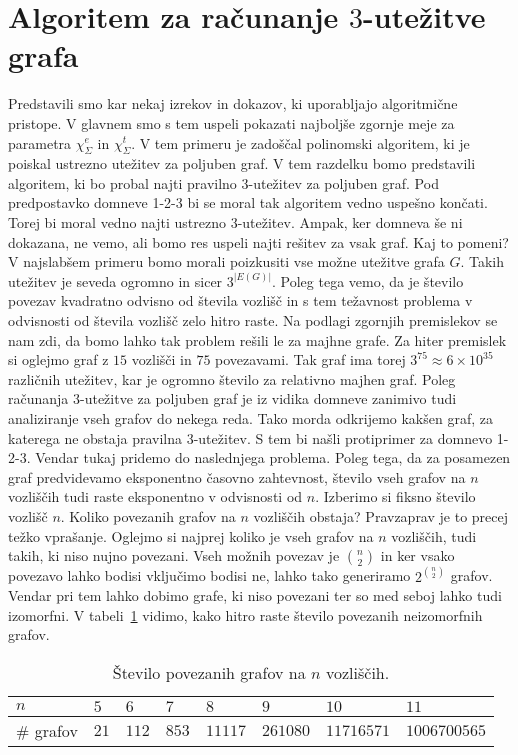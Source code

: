 \documentclass[12pt,a4paper,twoside]{article}
\theoremstyle{definition} %
\theoremstyle{plain} %
\newcommand{\ec}{\chi_{\Sigma}^e}
\newcommand{\ect}{\chi_{\Sigma}^t}
\numberwithin{equation}{section}  %
\begin{document}
\section{Algoritem za računanje $3$-utežitve grafa}
Predstavili smo kar nekaj izrekov in dokazov, ki uporabljajo algoritmične pristope. V glavnem smo s tem uspeli pokazati najboljše zgornje meje za parametra $\ec$ in $\ect$. V tem primeru je zadoščal polinomski algoritem, ki je poiskal ustrezno utežitev za poljuben graf. V tem razdelku bomo predstavili algoritem, ki bo probal najti pravilno $3$-utežitev za poljuben graf. Pod predpostavko domneve 1-2-3 bi se moral tak algoritem vedno uspešno končati. Torej bi moral vedno najti ustrezno $3$-utežitev. Ampak, ker domneva še ni dokazana, ne vemo, ali bomo res uspeli najti rešitev za vsak graf. Kaj to pomeni? V najslabšem primeru bomo morali poizkusiti vse možne utežitve grafa $G$. Takih utežitev je seveda ogromno in sicer $3^{|E(G)|}$. Poleg tega vemo, da je število povezav kvadratno odvisno od števila vozlišč in s tem težavnost problema v odvisnosti od števila vozlišč zelo hitro raste. Na podlagi zgornjih premislekov se nam zdi, da bomo lahko tak problem rešili le za majhne grafe. Za hiter premislek si oglejmo graf z $15$ vozlišči in $75$ povezavami. Tak graf ima torej $3^{75} \approx 6 \times 10^{35}$ različnih utežitev, kar je ogromno število za relativno majhen graf. Poleg računanja $3$-utežitve za poljuben graf je iz vidika domneve zanimivo tudi analiziranje vseh grafov do nekega reda. Tako morda odkrijemo kakšen graf, za katerega ne obstaja pravilna $3$-utežitev. S tem bi našli protiprimer za domnevo 1-2-3. Vendar tukaj pridemo do naslednjega problema. Poleg tega, da za posamezen graf predvidevamo eksponentno časovno zahtevnost, število vseh grafov na $n$ vozliščih tudi raste eksponentno v odvisnosti od $n$. Izberimo si fiksno število vozlišč $n$. Koliko povezanih grafov na $n$ vozliščih obstaja? Pravzaprav je to precej težko vprašanje. Oglejmo si najprej koliko je vseh grafov na $n$ vozliščih, tudi takih, ki niso nujno povezani. Vseh možnih povezav je $ {n \choose 2}$ in ker vsako povezavo lahko bodisi vključimo bodisi ne, lahko tako generiramo $2^{n \choose 2}$ grafov. Vendar pri tem lahko dobimo grafe, ki niso povezani ter so med seboj lahko tudi izomorfni. V tabeli~\ref{tbl:gnumb} vidimo, kako hitro raste število povezanih neizomorfnih grafov.
\begin{table}[h!]

\caption{Število povezanih grafov na $n$ vozliščih.}
\begin{tabular}{|l|l|l|l|l|l|l|l|}

\hline
\multicolumn{1}{|l|}{$n$} & $5$  & $6$   & $7$ & $8$ & $9$ & $10$ & $11$ \\ \hline
\# grafov                 & $21$ & $112$ & $853$  & $11117$  & $261080$  & $11716571$   & $1006700565$  \\ \hline
\end{tabular}

\label{tbl:gnumb}
\end{table}
\end{document}
